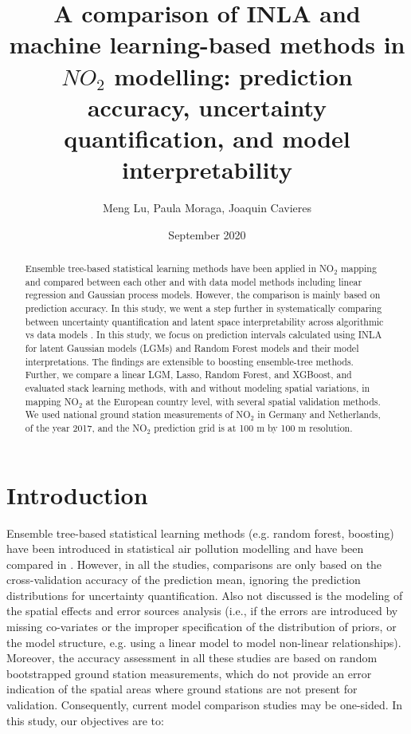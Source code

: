 \documentclass{article}
\author{Meng Lu, Paula Moraga, Joaquin Cavieres }
\date{September 2020}
\title{A comparison of INLA and machine learning-based methods in $NO_2$ modelling: prediction accuracy, uncertainty quantification, and model interpretability }
\begin{document}
\maketitle
\begin{abstract} 
Ensemble tree-based statistical learning methods have been applied in NO$_2$ mapping and compared between each other and with data model methods including linear regression and Gaussian process models. However, the comparison is mainly based on prediction accuracy. In this study, we went a step further in systematically comparing between uncertainty quantification and latent space interpretability across algorithmic vs data models \citep{breiman2001statistical}. In this study, we focus on prediction intervals calculated using INLA \citep{blangiardo2015spatial} for latent Gaussian models (LGMs) and Random Forest models and their model interpretations. The findings are extensible to boosting ensemble-tree methods. Further, we compare a linear LGM, Lasso, Random Forest, and XGBoost, and evaluated stack learning methods, with and without modeling spatial variations, in mapping NO$_2$ at the European country level, with several spatial validation methods. We used national ground station measurements of NO$_2$ in Germany and Netherlands, of the year 2017, and the NO$_2$ prediction grid is at 100 m by 100 m resolution.  
\end{abstract}

\section{Introduction}
Ensemble tree-based statistical learning methods (e.g. random forest, boosting) have been introduced in statistical air pollution modelling and have been compared in \cite{chen2019comparison,kerckhoffs2019performance,luglobal}. However, in all the studies, comparisons are only based on the cross-validation accuracy of the prediction mean, ignoring the prediction distributions for uncertainty quantification. Also not discussed is the modeling of the spatial effects and error sources analysis (i.e., if the errors are introduced by missing co-variates or the improper specification of the distribution of priors, or the model structure, e.g. using a linear model to model non-linear relationships). Moreover, the accuracy assessment in all these studies are based on random bootstrapped ground station measurements, which do not provide an error indication of the spatial areas where ground stations are not present for validation. Consequently, current model comparison studies may be one-sided. In this study, our objectives are to:
\end{document}

